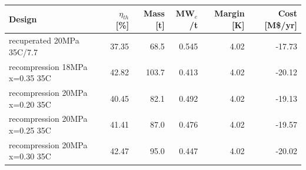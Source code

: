 \begin{tabular}{@{}lrrrrr@{}}
\toprule
Design & $\eta_{th}$ [\%] & Mass [t] & MW$_e$/t & Margin [K] & Cost [M\$/yr] \\
\midrule
recuperated 20MPa 35C/7.7 & 37.35 & 68.5 & 0.545 & 4.02 & -17.73 \\
recompression 18MPa x=0.35 35C & 42.82 & 103.7 & 0.413 & 4.02 & -20.12 \\
recompression 20MPa x=0.20 35C & 40.45 & 82.1 & 0.492 & 4.02 & -19.13 \\
recompression 20MPa x=0.25 35C & 41.41 & 87.0 & 0.476 & 4.02 & -19.57 \\
recompression 20MPa x=0.30 35C & 42.47 & 95.0 & 0.447 & 4.02 & -20.02 \\
\bottomrule
\end{tabular}
